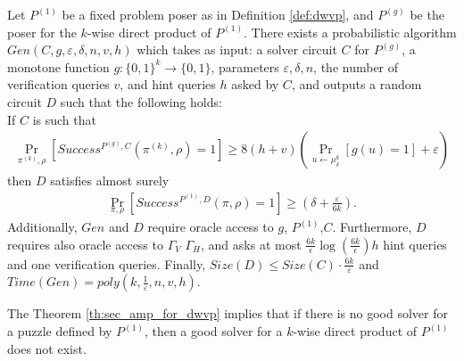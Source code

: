 \begin{theorem}
\label{th:sec_amp_for_dwvp}
Let $P^{(1)}$ be a fixed problem poser as in Definition \ref{def:dwvp}, and $P^{(g)}$ be the poser for the $k$-wise direct product of $P^{(1)}$.
There exists a probabilistic algorithm $Gen(C, g, \varepsilon, \delta, n, v, h)$ which takes as input: a solver circuit $C$ for $P^{(g)}$,
a monotone function $g:\{0,1\}^k \rightarrow \{0,1\}$, parameters $\varepsilon, \delta,n$,
the number of verification queries $v$, and hint queries $h$ asked by $C$, and outputs a random circuit $D$
such that the following holds: \\
If $C$ is such that \\
  \begin{align*}
    \underset{\pi^{(k)}, \rho}{\Pr}\left[Success^{P^{(g)}, C}(\pi^{(k)}, \rho) = 1\right] \geq 8(h+v)\left(\underset{u \leftarrow \mu_\delta^k}{\Pr}\left[g(u) = 1\right] + \varepsilon\right)
  \end{align*}
then $D$ satisfies almost surely
  \begin{align*}
    \underset{\pi, \rho}{\Pr}\left[Success^{P^{(1)},D}(\pi, \rho) = 1\right] \geq (\delta + \frac{\varepsilon}{6k}).
  \end{align*}
Additionally, $Gen$ and $D$ require oracle access to $g$, $P^{(1)}$,$C$.
Furthermore, $D$ requires also oracle access to $\Gamma_V$ $\Gamma_H$,
and asks at most $\frac{6k}{\epsilon}\log\left(\frac{6k}{\epsilon}\right) h$ hint queries and one verification queries.
Finally, $Size(D) \leq Size(C) \cdot \frac{6k}{\varepsilon}$ and $Time(Gen) = poly(k, \frac{1}{\varepsilon}, n, v, h)$.
\end{theorem}
%
The Theorem \ref{th:sec_amp_for_dwvp} implies that if there is no good solver for a puzzle defined by $P^{(1)}$, then a good solver for
a $k$-wise direct product of $P^{(1)}$ does not exist.
%
